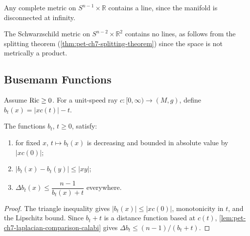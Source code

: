 \begin{example}
  \label{ex:pet-ch7-cylinder-contains-line}
  Any complete metric on $S^{n-1}\times\mathbb{R}$ contains a line, since the
  manifold is disconnected at infinity.
\end{example}

\begin{example}
  \label{ex:pet-ch7-schwarzschild-no-line}
  The Schwarzschild metric on $S^{n-2}\times\mathbb{R}^2$ contains no lines, as
  follows from the splitting theorem (\cref{thm:pet-ch7-splitting-theorem})
  since the space is not metrically a product.
\end{example}

\subsection{Busemann Functions}

Assume $\operatorname{Ric}\ge0$. For a unit-speed ray $c:[0,\infty)\to(M,g)$, define
$b_t(x)=|xc(t)|-t$.

\begin{proposition}
  \label{prop:pet-ch7-busemann-approximants}
  The functions $b_t$, $t\ge0$, satisfy:
  \begin{enumerate}
    \item[(1)] for fixed $x$, $t\mapsto b_t(x)$ is decreasing and bounded in
      absolute value by $|xc(0)|$;
    \item[(2)] $|b_t(x)-b_t(y)|\le|xy|$;
    \item[(3)] $\Delta b_t(x)\le\dfrac{n-1}{b_t(x)+t}$ everywhere.
  \end{enumerate}
\end{proposition}
\begin{proof}
  \sketch
  The triangle inequality gives \(|b_t(x)|\le|xc(0)|\), monotonicity in \(t\), and the Lipschitz bound. Since \(b_t+t\) is a distance function based at \(c(t)\), \cref{lem:pet-ch7-laplacian-comparison-calabi} gives \(\Delta b_t\le(n-1)/(b_t+t)\).
\end{proof}

